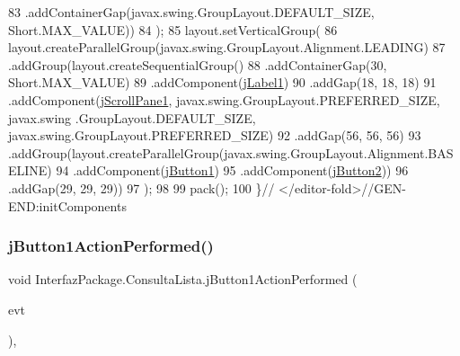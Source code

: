 \begin{DoxyCode}
83                 .addContainerGap(javax.swing.GroupLayout.DEFAULT\_SIZE, Short.MAX\_VALUE))
84         );
85         layout.setVerticalGroup(
86             layout.createParallelGroup(javax.swing.GroupLayout.Alignment.LEADING)
87             .addGroup(layout.createSequentialGroup()
88                 .addContainerGap(30, Short.MAX\_VALUE)
89                 .addComponent(\mbox{\hyperlink{class_interfaz_package_1_1_consulta_lista_a7cebe66cb1ff10204773f2c72f76b7f3}{jLabel1}})
90                 .addGap(18, 18, 18)
91                 .addComponent(\mbox{\hyperlink{class_interfaz_package_1_1_consulta_lista_a8b791a3cb8f0a4494b0e06d5b08fe9ad}{jScrollPane1}}, javax.swing.GroupLayout.PREFERRED\_SIZE, javax.swing
      .GroupLayout.DEFAULT\_SIZE, javax.swing.GroupLayout.PREFERRED\_SIZE)
92                 .addGap(56, 56, 56)
93                 .addGroup(layout.createParallelGroup(javax.swing.GroupLayout.Alignment.BASELINE)
94                     .addComponent(\mbox{\hyperlink{class_interfaz_package_1_1_consulta_lista_a3634a8b3f65730375cb85b196872cb4f}{jButton1}})
95                     .addComponent(\mbox{\hyperlink{class_interfaz_package_1_1_consulta_lista_a4ce758269cf41492829b3602f2d0f5ab}{jButton2}}))
96                 .addGap(29, 29, 29))
97         );
98 
99         pack();
100     \}\textcolor{comment}{// </editor-fold>//GEN-END:initComponents}
\end{DoxyCode}
\mbox{\label{class_interfaz_package_1_1_consulta_lista_a2924138ab98bafcc86ec498cfaf1d3c4}} 
\subsubsection{\texorpdfstring{j\+Button1\+Action\+Performed()}{jButton1ActionPerformed()}}
{\footnotesize\ttfamily void Interfaz\+Package.\+Consulta\+Lista.\+j\+Button1\+Action\+Performed (\begin{DoxyParamCaption}\item[{java.\+awt.\+event.\+Action\+Event}]{evt }\end{DoxyParamCaption})\hspace{0.3cm}{\ttfamily [inline]}, {\ttfamily [private]}}


